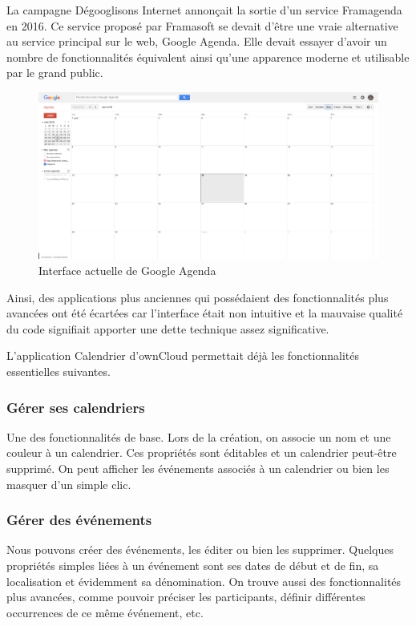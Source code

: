 \documentclass[10pt,a4paper, twoside]{report}
\begin{document}
	La campagne Dégooglisons Internet annonçait la sortie d'un service Framagenda en 2016. Ce service proposé par Framasoft se devait d'être une vraie alternative au service principal sur le web, Google Agenda. Elle devait essayer d'avoir un nombre de fonctionnalités équivalent ainsi qu'une apparence moderne et utilisable par le grand public.
	
	\begin{figure}[ht]
		\centering
		\centerline{\includegraphics[width=1.5\textwidth]{images/google-agenda-interface-actuelle.png}}
		\caption*{Interface actuelle de Google Agenda}
		\label{normal_case}
	\end{figure}
	
	Ainsi, des applications plus anciennes qui possédaient des fonctionnalités plus avancées ont été écartées car l'interface était non intuitive et la mauvaise qualité du code signifiait apporter une dette technique assez significative.
	
	L'application Calendrier d'ownCloud permettait déjà les fonctionnalités essentielles suivantes.
	
	\subsubsection{Gérer ses calendriers}
	Une des fonctionnalités de base. Lors de la création, on associe un nom et une couleur à un calendrier. Ces propriétés sont éditables et un calendrier peut-être supprimé. On peut afficher les événements associés à un calendrier ou bien les masquer d'un simple clic.
	
	\subsubsection{Gérer des événements}
	Nous pouvons créer des événements, les éditer ou bien les supprimer. Quelques propriétés simples liées à un événement sont ses dates de début et de fin, sa localisation et évidemment sa dénomination. On trouve aussi des fonctionnalités plus avancées, comme pouvoir préciser les participants, définir différentes occurrences de ce même événement, etc.
	
\end{document}
